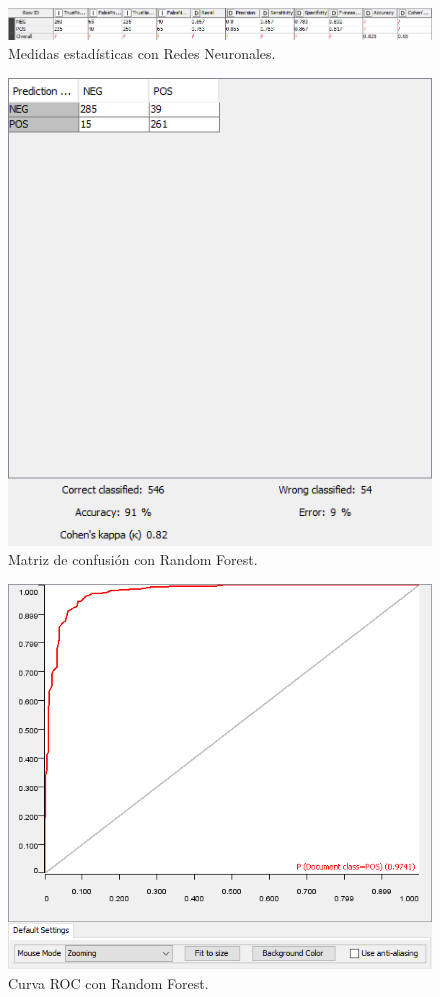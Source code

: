 \begin{figure}[H]
    \center\includegraphics[width=.95\linewidth]{img/classification/scoresNN.png}
    \caption{Medidas estadísticas con Redes Neuronales.}
\end{figure}


\begin{figure}[H]
    \center\includegraphics[width=.95\linewidth]{img/classification/cmRF.png}
    \caption{Matriz de confusión con Random Forest.}
\end{figure}

\begin{figure}[H]
    \center\includegraphics[width=.95\linewidth]{img/classification/rocRF.png}
    \caption{Curva ROC con Random Forest.}
\end{figure}


